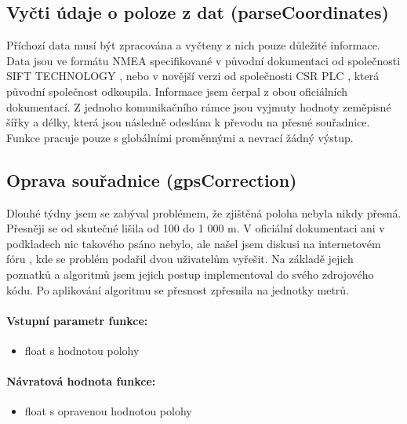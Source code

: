 \documentclass[FM,MP]{tulthesis}  %
\begin{document}
\subsection{Vyčti údaje o poloze z dat (parseCoordinates)}
Příchozí data musí být zpracována a vyčteny z nich pouze důležité informace. Data jsou ve formátu NMEA specifikované v původní dokumentaci od společnosti SIFT TECHNOLOGY \cite{SIFT}, nebo v novější verzi od společnosti CSR PLC \cite{CSR}, která původní společnost odkoupila. Informace jsem čerpal z obou oficiálních dokumentací. Z jednoho komunikačního rámce jsou vyjmuty hodnoty zeměpisné šířky a délky, která jsou následně odeslána k převodu na přesné souřadnice. Funkce pracuje pouze s globálními proměnnými a nevrací žádný výstup.

\subsection{Oprava souřadnice (gpsCorrection)}
Dlouhé týdny jsem se zabýval problémem, že zjištěná poloha nebyla nikdy přesná. Přesněji se od skutečné lišila od 100 do 1 000 m. V oficiální dokumentaci ani v podkladech nic takového psáno nebylo, ale našel jsem diskusi na internetovém fóru \cite{correct}, kde se problém podařil dvou uživatelům vyřešit. Na základě jejich poznatků a algoritmů jsem jejich postup implementoval do svého zdrojového kódu. Po aplikování algoritmu se přesnost zpřesnila na jednotky metrů.

\paragraph{Vstupní parametr funkce:}
\begin{itemize}
\item float s hodnotou polohy
\end{itemize}

\paragraph{Návratová hodnota funkce:}
\begin{itemize}
\item float s opravenou hodnotou polohy
\end{itemize}
\end{document}
